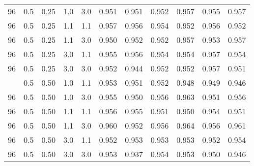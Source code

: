 \begin{longtable}[t]{cccccrrrrrr}
96 & 0.5 & 0.25 & 1.0 & 3.0 & 0.951 & 0.951 & 0.952 & 0.957 & 0.955 & 0.957\\
96 & 0.5 & 0.25 & 1.1 & 1.1 & 0.957 & 0.956 & 0.954 & 0.952 & 0.956 & 0.952\\
96 & 0.5 & 0.25 & 1.1 & 3.0 & 0.950 & 0.952 & 0.952 & 0.957 & 0.953 & 0.957\\
96 & 0.5 & 0.25 & 3.0 & 1.1 & 0.955 & 0.956 & 0.954 & 0.954 & 0.957 & 0.954\\
96 & 0.5 & 0.25 & 3.0 & 3.0 & 0.952 & 0.944 & 0.952 & 0.952 & 0.957 & 0.951\\
\addlinespace
96 & 0.5 & 0.50 & 1.0 & 1.1 & 0.953 & 0.951 & 0.952 & 0.948 & 0.949 & 0.946\\
96 & 0.5 & 0.50 & 1.0 & 3.0 & 0.955 & 0.950 & 0.956 & 0.963 & 0.951 & 0.956\\
96 & 0.5 & 0.50 & 1.1 & 1.1 & 0.956 & 0.955 & 0.951 & 0.950 & 0.954 & 0.951\\
96 & 0.5 & 0.50 & 1.1 & 3.0 & 0.960 & 0.952 & 0.956 & 0.964 & 0.956 & 0.961\\
96 & 0.5 & 0.50 & 3.0 & 1.1 & 0.952 & 0.953 & 0.953 & 0.953 & 0.952 & 0.954\\
96 & 0.5 & 0.50 & 3.0 & 3.0 & 0.953 & 0.937 & 0.954 & 0.953 & 0.950 & 0.946\\
\bottomrule
\end{longtable}
\endgroup{}
